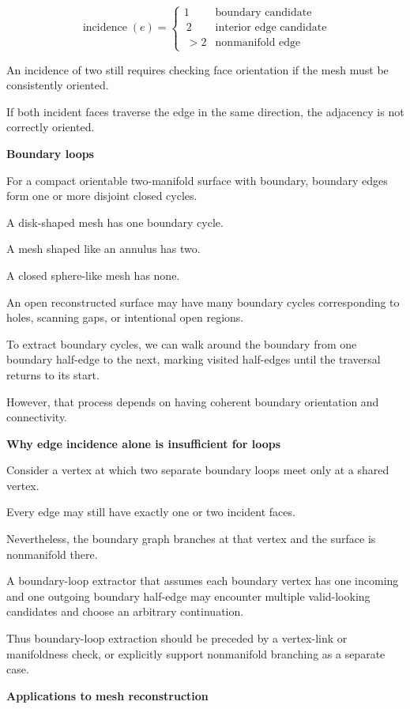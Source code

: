 \[
\operatorname{incidence}(e)= \begin{cases} 1 & \text{boundary candidate}\\\ 2 & \text{interior edge candidate}\\\ >2 & \text{nonmanifold edge} \end{cases}
\]

An incidence of two still requires checking face orientation if the mesh must be consistently oriented.

If both incident faces traverse the edge in the same direction, the adjacency is not correctly oriented.

\textbf{Boundary loops}

For a compact orientable two-manifold surface with boundary, boundary edges form one or more disjoint closed cycles.

A disk-shaped mesh has one boundary cycle.

A mesh shaped like an annulus has two.

A closed sphere-like mesh has none.

An open reconstructed surface may have many boundary cycles corresponding to holes, scanning gaps, or intentional open regions.

To extract boundary cycles, we can walk around the boundary from one boundary half-edge to the next, marking visited half-edges until the traversal returns to its start.

However, that process depends on having coherent boundary orientation and connectivity.

\textbf{Why edge incidence alone is insufficient for loops}

Consider a vertex at which two separate boundary loops meet only at a shared vertex.

Every edge may still have exactly one or two incident faces.

Nevertheless, the boundary graph branches at that vertex and the surface is nonmanifold there.

A boundary-loop extractor that assumes each boundary vertex has one incoming and one outgoing boundary half-edge may encounter multiple valid-looking candidates and choose an arbitrary continuation.

Thus boundary-loop extraction should be preceded by a vertex-link or manifoldness check, or explicitly support nonmanifold branching as a separate case.

\textbf{Applications to mesh reconstruction}

